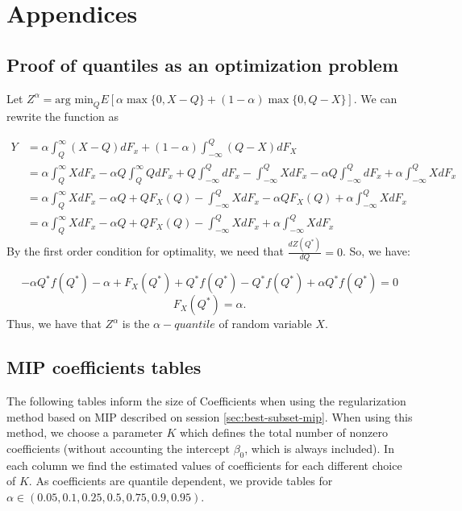 \section{Appendices}
\label{appendice}

\subsection{Proof of quantiles as an optimization problem}
\label{sec:quantile-proof}
Let $Z^{\alpha}=\mbox{arg min}_{Q}E[\alpha\max\{0,X-Q\}+(1-\alpha)\max\{0,Q-X\}].$
We can rewrite the function as

\[
\begin{aligned}Y & =\alpha\int_{Q}^{\infty}(X-Q)dF_{x}+(1-\alpha)\int_{-\infty}^{Q}(Q-X)dF_{X}\\
& =\alpha\int_{Q}^{\infty}XdF_{x}-\alpha Q\int_{Q}^{\infty}QdF_{x}+Q\int_{-\infty}^{Q}dF_{x}-\int_{-\infty}^{Q}XdF_{x}-\alpha Q\int_{-\infty}^{Q}dF_{x}+\alpha\int_{-\infty}^{Q}XdF_{x}\\
& =\alpha\int_{Q}^{\infty}XdF_{x}-\alpha Q+QF_{X}(Q)-\int_{-\infty}^{Q}XdF_{x}-\alpha QF_{X}(Q)+\alpha\int_{-\infty}^{Q}XdF_{x}\\
& =\alpha\int_{Q}^{\infty}XdF_{x}-\alpha Q+QF_{X}(Q)-\int_{-\infty}^{Q}XdF_{x}+\alpha\int_{-\infty}^{Q}XdF_{x}
\end{aligned}
\]
By the first order condition for optimality, we need that $\frac{dZ(Q^{*})}{dQ}=0$.
So, we have:

\[
-\alpha Q^{*}f(Q^{*})-\alpha+F_{X}(Q^{*})+Q^{*}f(Q^{*})-Q^{*}f(Q^{*})+\alpha Q^{*}f(Q^{*})=0
\]
\[
F_{X}(Q^{*})=\alpha.
\]
Thus, we have that $Z^\alpha$ is the $\alpha-quantile$ of random variable $X$.

\subsection{MIP coefficients tables}
\label{sec:mipcoefficients}
The following tables inform the size of Coefficients when using the regularization method based on MIP described on session \ref{sec:best-subset-mip}. When using this method, we choose a parameter $K$ which defines the total number of nonzero coefficients (without accounting the intercept $\beta_0$, which is always included). 
In each column we find the estimated values of coefficients for each different choice of $K$. As coefficients are quantile dependent, we provide tables for $\alpha \in (0.05, 0.1, 0.25, 0.5, 0.75, 0.9, 0.95)$.


